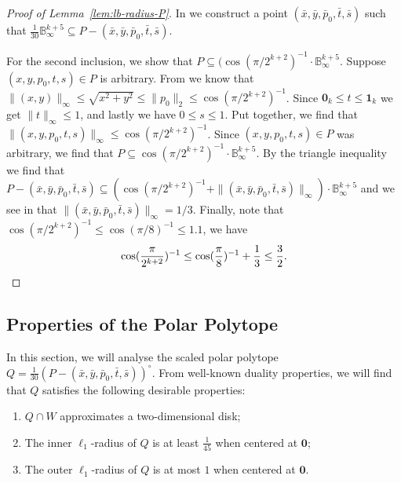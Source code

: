 \documentclass{theoretics}
\renewcommand{\subset}{\subseteq}
\begin{document}
\begin{proof}[Proof of Lemma~\ref{lem:lb-radius-P}]
In  we construct a point $(\bar x, \bar y, \bar p_0, \bar t, \bar s)$
such that $\frac{1}{30}\mathbb{B}_\infty^{k+5} \subset P - (\bar x, \bar y, \bar{p}_0, \bar t, \bar{s})$.

For the second inclusion, we show that $P \subset (\cos(\pi/2^{k+2})^{-1}\cdot \mathbb{B}_\infty^{k+5}$.
Suppose $(x,y,p_0,t,s) \in P$ is arbitrary. From  we know
that $\|(x,y)\|_\infty \leq \sqrt{x^2 + y^2} \leq \|p_0\|_2 \leq \cos(\pi/2^{k+2})^{-1}$.
Since $\mathbf{0}_k \leq t \leq \mathbf{1}_k$ we get $\|t\|_\infty \leq 1$, and
lastly we have $0 \leq s \leq 1$.
Put together, we find that $\|(x,y,p_0,t,s)\|_\infty \leq \cos(\pi/2^{k+2})^{-1}$.
Since $(x,y,p_0,t,s) \in P$ was arbitrary, we find that $P \subset \cos(\pi/2^{k+2})^{-1}\cdot \mathbb{B}_\infty^{k+5}$.
By the triangle inequality we find that
$P - (\bar x, \bar y, \bar{p}_0, \bar t, \bar{s}) \subset (\cos(\pi/2^{k+2})^{-1} + \|(\bar x, \bar y, \bar p_0, \bar t, \bar s)\|_\infty)\cdot \mathbb{B}_\infty^{k+5}$
and we see in  that $\|(\bar x, \bar y, \bar p_0, \bar t, \bar s)\|_\infty = 1/3$.
Finally, note that $\cos(\pi/2^{k+2})^{-1} \leq \cos(\pi/8)^{-1} \leq 1.1$, we have 
\[
    \cos(\frac{\pi}{2^{k+2}})^{-1} \leq \cos(\frac{\pi}{8})^{-1} + \frac{1}{3} \leq \frac{3}{2}.\qedhere
\]
\end{proof}


\subsection{Properties of the Polar Polytope}\label{sec:lb-dual}

In this section, we will analyse the scaled polar polytope
$Q = \frac{1}{30}(P - (\bar x, \bar y,\bar p_0, \bar t, \bar s))^\circ$.
From well-known duality properties, we will find that $Q$ satisfies the following desirable properties:
\begin{enumerate}
    \item $Q \cap W$ approximates a two-dimensional disk;
    \item The inner $\ell_1$-radius of $Q$ is at least $\frac{1}{45}$ when centered at $\mathbf{0}$;
    \item The outer $\ell_1$-radius of $Q$ is at most $1$ when centered at $\mathbf{0}$.
\end{enumerate}
\end{document}
